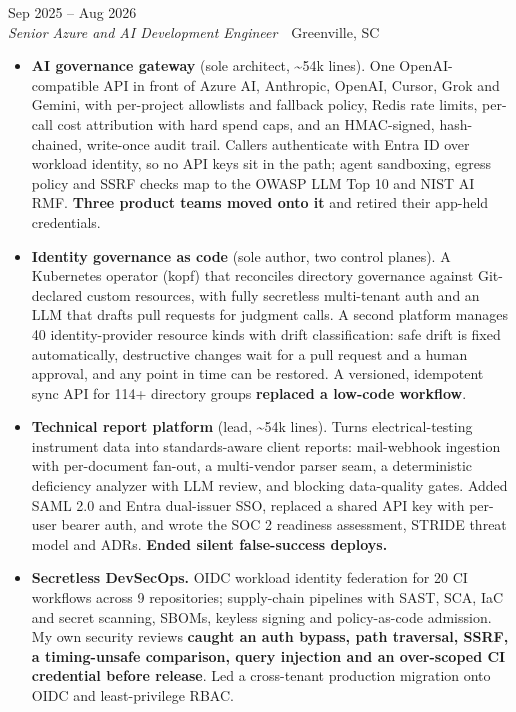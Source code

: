 \documentclass[10pt,letterpaper]{article}
\newcommand{\szmeta}{\fontsize{8pt}{10pt}\selectfont}
\begin{document}
\vspace{3pt}
 \hfill {\color{muted}\szmeta Sep 2025 – Aug 2026}\\[1pt]
{\itshape Senior Azure and AI Development Engineer}{\color{muted}\ \textbullet\ Greenville, SC}
\vspace{2pt}
\begin{itemize}
\item \textbf{AI governance gateway} {\color{muted}(sole architect, \textasciitilde{}54k lines)}. One OpenAI-compatible API in front of Azure AI, Anthropic, OpenAI, Cursor, Grok and Gemini, with per-project allowlists and fallback policy, Redis rate limits, per-call cost attribution with hard spend caps, and an HMAC-signed, hash-chained, write-once audit trail. Callers authenticate with Entra ID over workload identity, so no API keys sit in the path; agent sandboxing, egress policy and SSRF checks map to the OWASP LLM Top 10 and NIST AI RMF. \textbf{Three product teams moved onto it} and retired their app-held credentials.
\item \textbf{Identity governance as code} {\color{muted}(sole author, two control planes)}. A Kubernetes operator (kopf) that reconciles directory governance against Git-declared custom resources, with fully secretless multi-tenant auth and an LLM that drafts pull requests for judgment calls. A second platform manages 40 identity-provider resource kinds with drift classification: safe drift is fixed automatically, destructive changes wait for a pull request and a human approval, and any point in time can be restored. A versioned, idempotent sync API for 114+ directory groups \textbf{replaced a low-code workflow}.
\item \textbf{Technical report platform} {\color{muted}(lead, \textasciitilde{}54k lines)}. Turns electrical-testing instrument data into standards-aware client reports: mail-webhook ingestion with per-document fan-out, a multi-vendor parser seam, a deterministic deficiency analyzer with LLM review, and blocking data-quality gates. Added SAML 2.0 and Entra dual-issuer SSO, replaced a shared API key with per-user bearer auth, and wrote the SOC 2 readiness assessment, STRIDE threat model and ADRs. \textbf{Ended silent false-success deploys.}
\item \textbf{Secretless DevSecOps.} OIDC workload identity federation for 20 CI workflows across 9 repositories; supply-chain pipelines with SAST, SCA, IaC and secret scanning, SBOMs, keyless signing and policy-as-code admission. My own security reviews \textbf{caught an auth bypass, path traversal, SSRF, a timing-unsafe comparison, query injection and an over-scoped CI credential before release}. Led a cross-tenant production migration onto OIDC and least-privilege RBAC.
\end{itemize}
\end{document}
